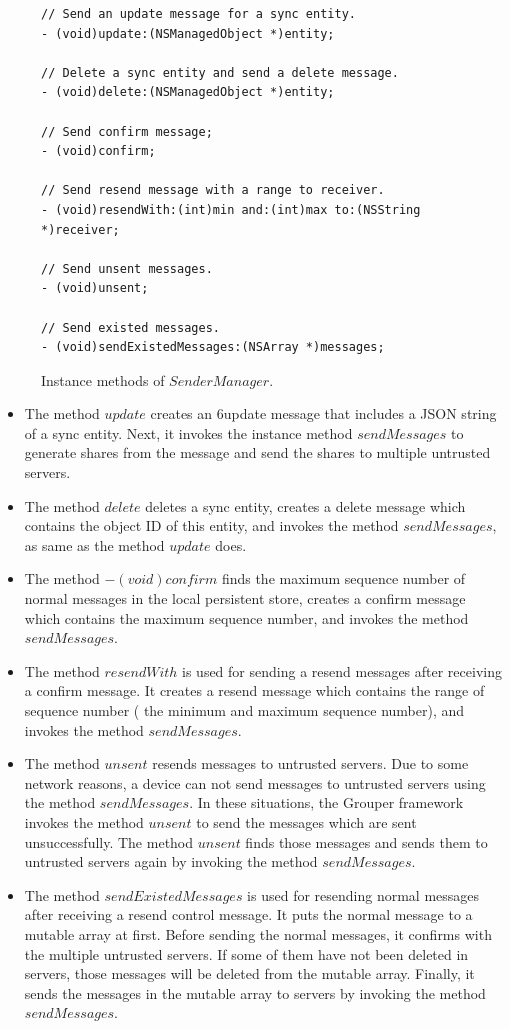 \documentclass[a4paper,11pt]{report}
\begin{document}
\begin{figure}
\begin{lstlisting}[frame=none language=Objective-C] 
// Send an update message for a sync entity.
- (void)update:(NSManagedObject *)entity;

// Delete a sync entity and send a delete message.
- (void)delete:(NSManagedObject *)entity;

// Send confirm message;
- (void)confirm;

// Send resend message with a range to receiver.
- (void)resendWith:(int)min and:(int)max to:(NSString *)receiver;

// Send unsent messages.
- (void)unsent;

// Send existed messages.
- (void)sendExistedMessages:(NSArray *)messages;	
\end{lstlisting}
\caption{Instance methods of $SenderManager$.}
\label{fig:sender_manager}
\end{figure}

\begin{itemize}[leftmargin=7mm]
	\setlength{\itemsep}{1pt}
	\setlength{\parskip}{0pt}
	\setlength{\parsep}{0pt}
	\item 
	The method $update$ creates an 6update message that includes a JSON string of a sync entity. Next, it invokes the instance method $sendMessages$ to generate shares from the message and send the shares to multiple untrusted servers.
	\item 
	The method $delete$ deletes a sync entity, creates a delete message which contains the object ID of this entity, and invokes the method $sendMessages$, as same as the method $update$ does.
	\item 
	The method $- (void)confirm$ finds the maximum sequence number of normal messages in the local persistent store, creates a confirm message which contains the maximum sequence number, and invokes the method $sendMessages$.
	\item 
	The method $resendWith$ is used for sending a resend messages after receiving a confirm message.
	It creates a resend message which contains the range of sequence number ( the minimum and maximum sequence number), and invokes the method $sendMessages$.
	\item 
	The method $unsent$ resends messages to untrusted servers. 
	Due to some network reasons, a device can not send messages to untrusted servers using the method $sendMessages$.
	In these situations, the Grouper framework invokes the method $unsent$ to send the messages which are sent unsuccessfully.
	The method $unsent$ finds those messages and sends them to untrusted servers again by invoking the method $sendMessages$.
	\item 
	The method $sendExistedMessages$ is used for resending normal messages after receiving a resend control message.
	It puts the normal message to a mutable array at first.
	Before sending the normal messages, it confirms with the multiple untrusted servers.
	If some of them have not been deleted in servers, those messages will be deleted from the mutable array.
	Finally, it sends the messages in the mutable array to servers by invoking the method $sendMessages$.
\end{itemize}
\end{document}
